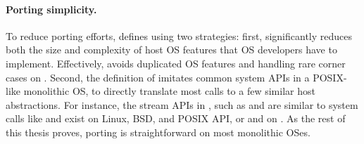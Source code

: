 \paragraph{Porting simplicity.}
To reduce porting efforts,
\graphene{} defines \thehostabi{}
using two strategies:
first, \graphene{} significantly reduces both the size and complexity of host OS features
that OS developers have to implement.
Effectively, \graphene{} avoids duplicated OS features and handling rare corner cases
on \thehostabi{}.
Second, the definition of \thehostabi{}
imitates common system APIs in a POSIX-like monolithic OS,
to directly translate most calls to
a few similar host abstractions.
For instance,
the stream APIs in \thehostabi{}, such as  and 
are similar to
system calls like  and  exist on Linux, BSD, and POSIX API,
or  and 
on \win{}.
As the rest of this thesis proves, porting \thehostabi{} is straightforward
on most monolithic OSes.


